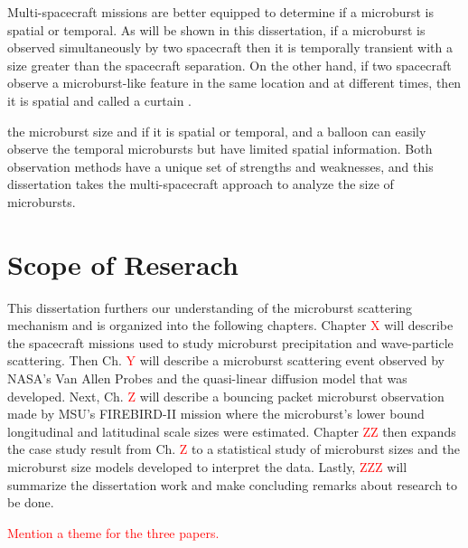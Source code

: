 Multi-spacecraft missions are better equipped to determine if a microburst is spatial or temporal. As will be shown in this dissertation, if a microburst is observed simultaneously by two spacecraft then it is temporally transient with a size greater than the spacecraft separation. On the other hand, if two spacecraft observe a microburst-like feature in the same location and at different times, then it is spatial and called a curtain \citep{Blake2016}.

the microburst size and if it is spatial or temporal, and a balloon can easily observe the temporal microbursts but have limited spatial information. Both observation methods have a unique set of strengths and weaknesses, and this dissertation takes the multi-spacecraft approach to analyze the size of microbursts.


\section{Scope of Reserach}\label{Intro:scope}
This dissertation furthers our understanding of the microburst scattering mechanism and is organized into the following chapters. Chapter \textcolor{red}{X} will describe the spacecraft missions used to study microburst precipitation and wave-particle scattering. Then Ch. \textcolor{red}{Y} will describe a microburst scattering event observed by NASA's Van Allen Probes and the quasi-linear diffusion model that was developed. Next, Ch. \textcolor{red}{Z} will describe a bouncing packet microburst observation made by MSU's FIREBIRD-II mission where the microburst's lower bound longitudinal and latitudinal scale sizes were estimated. Chapter \textcolor{red}{ZZ} then expands the case study result from Ch. \textcolor{red}{Z} to a statistical study of microburst sizes and the microburst size models developed to interpret the data. Lastly, \textcolor{red}{ZZZ} will summarize the dissertation work and make concluding remarks about research to be done.

\textcolor{red}{Mention a theme for the three papers.}